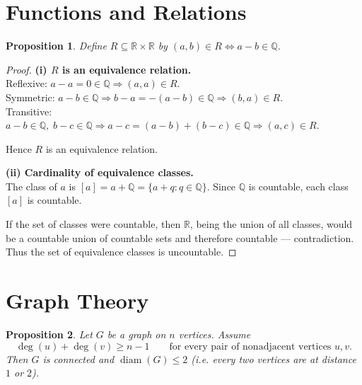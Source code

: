 \documentclass{article}
\title{}
\author{}
\date{}
\theoremstyle{plain}
\newtheorem{proposition}{Proposition}
\theoremstyle{definition}
\theoremstyle{remark}
\begin{document}
\maketitle
\section{Functions and Relations}
\begin{proposition}
    Define \(R\subseteq\mathbb{R}\times\mathbb{R}\) by
\((a,b)\in R \iff a-b\in\mathbb{Q}\).
\end{proposition}
\begin{proof}
    


\textbf{(i) $R$ is an equivalence relation.} \\
Reflexive: \(a-a=0\in\mathbb{Q}\Rightarrow (a,a)\in R\).\\
Symmetric: \(a-b\in\mathbb{Q}\Rightarrow b-a=-(a-b)\in\mathbb{Q}\Rightarrow (b,a)\in R\).\\
Transitive: \(a-b\in\mathbb{Q},\; b-c\in\mathbb{Q}\Rightarrow a-c=(a-b)+(b-c)\in\mathbb{Q}\Rightarrow (a,c)\in R\).

Hence \(R\) is an equivalence relation.

\medskip
\textbf{(ii) Cardinality of equivalence classes.} \\
The class of \(a\) is \( [a]=a+\mathbb{Q}=\{a+q:q\in\mathbb{Q}\}\). Since \(\mathbb{Q}\) is countable, each class \([a]\) is countable.

If the set of classes were countable, then \(\mathbb{R}\), being the union of all classes, would be a countable union of countable sets and therefore countable — contradiction. Thus the set of equivalence classes is uncountable.

\end{proof}

\section{Graph Theory}
\begin{proposition}
Let $G$ be a graph on $n$ vertices. Assume
\[
\deg(u)+\deg(v)\ge n-1\qquad\text{for every pair of nonadjacent vertices }u,v.
\]
Then $G$ is connected and $\operatorname{diam}(G)\le 2$ (i.e. every two vertices
are at distance $1$ or $2$).
\end{proposition}
\end{document}
